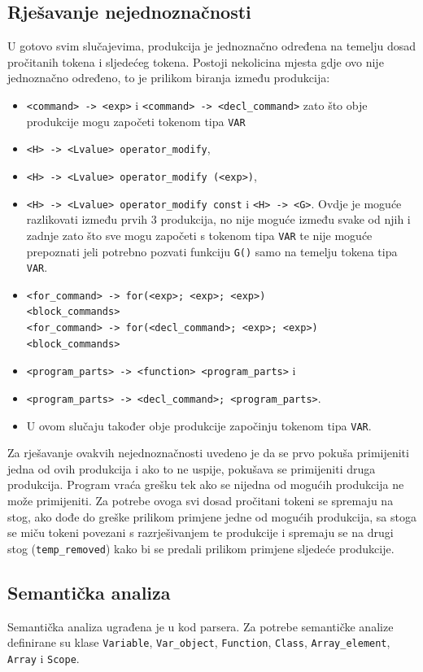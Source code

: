 \documentclass[times, utf8, zavrsni]{fer}
\begin{document}
\subsection{Rješavanje nejednoznačnosti}
U gotovo svim slučajevima, produkcija je jednoznačno određena
na temelju dosad pročitanih tokena i sljedećeg tokena. Postoji nekolicina mjesta gdje ovo nije jednoznačno određeno, to je prilikom biranja između produkcija:
\begin{itemize}
    \item \verb|<command> -> <exp>| i \verb|<command> -> <decl_command>| zato što obje produkcije mogu započeti tokenom tipa \verb|VAR|
    \item \verb|<H> -> <Lvalue> operator_modify|,
    \item[] \verb|<H> -> <Lvalue> operator_modify (<exp>)|, 
    \item[] \verb|<H> -> <Lvalue> operator_modify const| i \verb|<H> -> <G>|. Ovdje je moguće razlikovati između prvih 3 produkcija, 
    no nije moguće između svake od njih i zadnje zato što sve mogu započeti s tokenom tipa \verb|VAR| te nije moguće prepoznati jeli potrebno pozvati funkciju \verb|G()|
    samo na temelju tokena tipa \verb|VAR|.
    \item \begin{verbatim}
<for_command> -> for(<exp>; <exp>; <exp>)
<block_commands>
<for_command> -> for(<decl_command>; <exp>; <exp>) 
<block_commands>
    \end{verbatim}
    \item \verb|<program_parts> -> <function> <program_parts>| i
    \item[] \verb|<program_parts> -> <decl_command>; <program_parts>|. 
    \item[] U ovom slučaju također obje produkcije započinju tokenom tipa \verb|VAR|.
\end{itemize}
Za rješavanje ovakvih nejednoznačnosti uvedeno je da se prvo pokuša primijeniti jedna od ovih produkcija i ako to ne uspije, pokušava se primijeniti druga produkcija.
Program vraća grešku tek ako se nijedna od mogućih produkcija ne može primijeniti. Za potrebe ovoga svi dosad pročitani tokeni se spremaju na stog,
ako dođe do greške prilikom primjene jedne od mogućih produkcija, sa stoga se miču tokeni povezani s razrješivanjem te produkcije i spremaju se na drugi stog (\verb|temp_removed|)
kako bi se predali prilikom primjene sljedeće produkcije.

\subsection{Semantička analiza}
Semantička analiza ugrađena je u kod parsera. Za potrebe semantičke analize definirane su klase \verb|Variable|, \verb|Var_object|, \verb|Function|, 
\verb|Class|, \verb|Array_element|, \verb|Array| i \verb|Scope|. 
\end{document}
